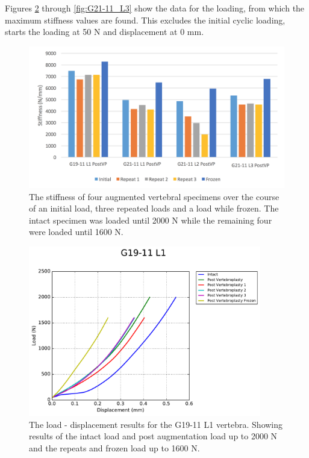 Figures \ref{fig:G19-11_L1} through \ref{fig:G21-11_L3} show the data for the loading, from which the maximum stiffness values are found.
This excludes the initial cyclic loading, starts the loading at 50 N and displacement at 0 mm.

\begin{figure}[!h]
\centering
\includegraphics[width=6in]{Chapters/Chapter_HT_images/experimental_repeats.png}
\caption{The stiffness of four augmented vertebral specimens over the course of an initial load, three repeated loads and a load while frozen. The intact specimen was loaded until 2000 N while the remaining four were loaded until 1600 N.}
\label{fig:exp_repeats}
\end{figure}


\begin{figure}[H]
\centering
\includegraphics[width=4in]{Chapters/Chapter_HT_images/G19-11_L1.pdf}
\caption{The load - displacement results for the G19-11 L1 vertebra. Showing results of the intact load and post augmentation load up to 2000 N and the repeats and frozen load up to 1600 N.}
\label{fig:G19-11_L1}
\end{figure}

